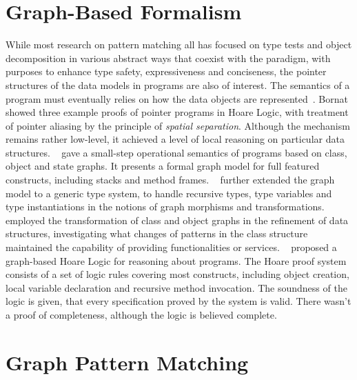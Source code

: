 \section{Graph-Based Formalism}

While most research on {\OO} pattern matching all has focused on type tests and object decomposition in various abstract ways that
coexist with the {\OO} paradigm, with purposes to enhance type safety, expressiveness and conciseness,
the pointer structures of the data models in {\OO} programs are also of interest.
The semantics of a program must eventually relies on how the data objects are represented~\cite{gunter1992semantics}.
Bornat~\cite{bornat2000pointer} showed three example proofs of pointer programs in Hoare Logic, with treatment of pointer aliasing
by the principle of \emph{spatial separation}. Although the mechanism remains rather low-level, it achieved a level of local reasoning on particular data structures.
~\cite{ke2009graph} gave a small-step operational semantics of {\OO} programs based on class, object and state graphs.
It presents a formal graph model for full featured {\OO} constructs, including stacks and method frames.
~\cite{ke2013graph} further extended the graph model to a generic type system,
to handle recursive types, type variables and type instantiations in the notions of graph morphisms and transformations.
~\cite{zhao2009graph} employed the transformation of class and object graphs in the refinement of {\OO} data structures,
investigating what changes of patterns in the class structure maintained the capability of providing functionalities or services.
~\cite{zhao2013graph} proposed a graph-based Hoare Logic for reasoning about {\OO} programs.
The Hoare proof system consists of a set of logic rules covering most {\OO} constructs, including object creation, local variable declaration and recursive method invocation.
The soundness of the logic is given, that every specification proved by the system is valid. There wasn't a proof of completeness, although the logic is believed complete.

\section{Graph Pattern Matching}

